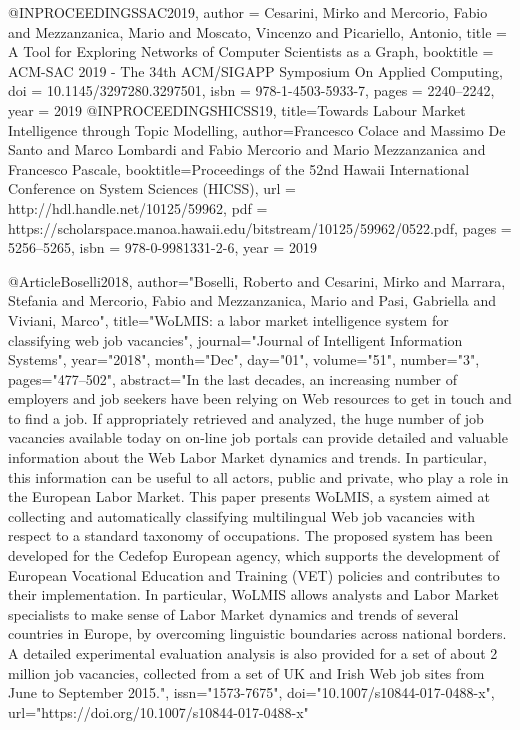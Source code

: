 {@INPROCEEDINGS{SAC2019,
author = {Cesarini, Mirko and Mercorio, Fabio and Mezzanzanica, Mario and Moscato, Vincenzo and Picariello, Antonio},
title = {A Tool for Exploring Networks of Computer Scientists as a Graph},
booktitle = {ACM-SAC 2019 - The 34th ACM/SIGAPP Symposium On Applied Computing},
doi       = {10.1145/3297280.3297501},
isbn      = {978-1-4503-5933-7},
pages     = {2240--2242},
year = {2019}
}
@INPROCEEDINGS{HICSS19,    
 title={Towards Labour Market Intelligence through Topic Modelling},     
 author={Francesco Colace and Massimo De Santo and Marco Lombardi and Fabio Mercorio and Mario Mezzanzanica and Francesco Pascale},    
 booktitle={Proceedings of the 52nd Hawaii International Conference on System Sciences (HICSS)},     
 url = {http://hdl.handle.net/10125/59962},
 pdf = {https://scholarspace.manoa.hawaii.edu/bitstream/10125/59962/0522.pdf},
 pages = {5256--5265},
 isbn = {978-0-9981331-2-6}, 
 year = {2019}     
}

@Article{Boselli2018,
author="Boselli, Roberto and Cesarini, Mirko and Marrara, Stefania and Mercorio, Fabio and Mezzanzanica, Mario and Pasi, Gabriella and Viviani, Marco",
title="WoLMIS: a labor market intelligence system for classifying web job vacancies",
journal="Journal of Intelligent Information Systems",
year="2018",
month="Dec",
day="01",
volume="51",
number="3",
pages="477--502",
abstract="In the last decades, an increasing number of employers and job seekers have been relying on Web resources to get in touch and to find a job. If appropriately retrieved and analyzed, the huge number of job vacancies available today on on-line job portals can provide detailed and valuable information about the Web Labor Market dynamics and trends. In particular, this information can be useful to all actors, public and private, who play a role in the European Labor Market. This paper presents WoLMIS, a system aimed at collecting and automatically classifying multilingual Web job vacancies with respect to a standard taxonomy of occupations. The proposed system has been developed for the Cedefop European agency, which supports the development of European Vocational Education and Training (VET) policies and contributes to their implementation. In particular, WoLMIS allows analysts and Labor Market specialists to make sense of Labor Market dynamics and trends of several countries in Europe, by overcoming linguistic boundaries across national borders. A detailed experimental evaluation analysis is also provided for a set of about 2 million job vacancies, collected from a set of UK and Irish Web job sites from June to September 2015.",
issn="1573-7675",
doi="10.1007/s10844-017-0488-x",
url="https://doi.org/10.1007/s10844-017-0488-x"
}



}
